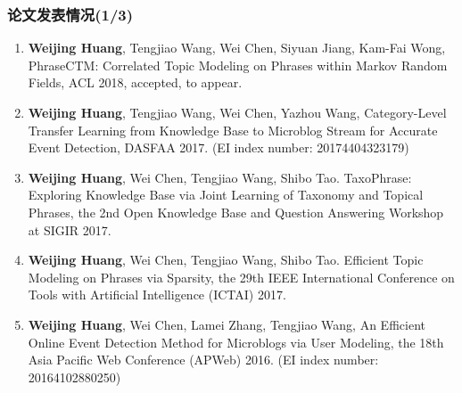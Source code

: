 \begin{transparentFootline}
\begin{frame}
\frametitle{论文发表情况(1/3)}

\footnotesize
\begin{enumerate}
\item \textbf{Weijing Huang}, Tengjiao Wang, Wei Chen, Siyuan Jiang, Kam-Fai Wong, PhraseCTM: Correlated Topic Modeling on Phrases within Markov Random Fields, ACL 2018, accepted, to appear. 
\item \textbf{Weijing Huang}, Tengjiao Wang, Wei Chen, Yazhou Wang, Category-Level Transfer Learning from Knowledge Base to Microblog Stream for Accurate Event Detection, DASFAA 2017. (EI index number: 20174404323179)
\item \textbf{Weijing Huang}, Wei Chen, Tengjiao Wang, Shibo Tao. TaxoPhrase: Exploring Knowledge Base via Joint Learning of Taxonomy and Topical Phrases, the 2nd Open Knowledge Base and Question Answering Workshop at SIGIR 2017.
\item \textbf{Weijing Huang}, Wei Chen, Tengjiao Wang, Shibo Tao. Efficient Topic Modeling on Phrases via Sparsity, the 29th IEEE International Conference on Tools with Artificial Intelligence (ICTAI) 2017. 
\item \textbf{Weijing Huang}, Wei Chen, Lamei Zhang, Tengjiao Wang, An Efficient Online Event Detection Method for Microblogs via User Modeling, the 18th Asia Pacific Web Conference (APWeb) 2016. (EI index number: 20164102880250)
\end{enumerate}
\end{frame}
\end{transparentFootline}

